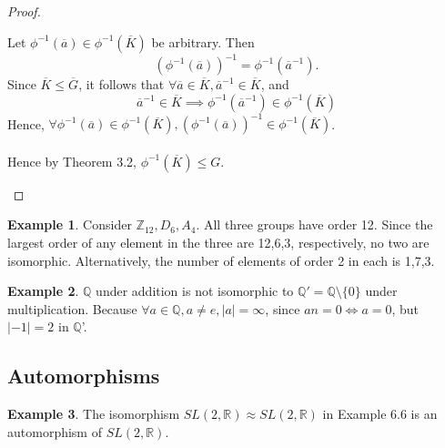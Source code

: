 \documentclass{article}
\theoremstyle{definition}
\newtheorem{definition}{Definition}[section]
\newtheorem{example}{Example}[section]
\begin{document}
\begin{proof}
\begin{enumerate}[label=(\roman*)]
         Let $\phi^{-1}(\overline{a}) \in \phi^{-1}(\overline{K})$ be arbitrary. Then
         \begin{equation*}
             (\phi^{-1}(\overline{a}))^{-1} = \phi^{-1}(\overline{a}^{-1}).
         \end{equation*}
         Since $\overline{K} \leq \overline{G}$, it follows that $\forall \overline{a} \in \overline{K}, \overline{a}^{-1} \in \overline{K}$, and
         \begin{equation*}
             \overline{a}^{-1} \in \overline{K} \implies \phi^{-1}(\overline{a}^{-1}) \in \phi^{-1}(\overline{K})
         \end{equation*}
         Hence, $\forall \phi^{-1}(\overline{a}) \in \phi^{-1}(\overline{K}), (\phi^{-1}(\overline{a}))^{-1} \in \phi^{-1}(\overline{K})$.
         \\ \\
         Hence by Theorem 3.2, $\phi^{-1}(\overline{K}) \leq G$.
     \end{enumerate}
 \end{proof}
 
 \begin{example}
     Consider $\mathbb{Z}_12, D_6, A_4$. All three groups have order 12. Since the largest order of any element in the three are 12,6,3, respectively, no two are isomorphic. Alternatively, the number of elements of order 2 in each is 1,7,3.
 \end{example}
 
 \begin{example}
     $\mathbb{Q}$ under addition is not isomorphic to $\mathbb{Q}' = \mathbb{Q} \setminus \{0\}$ under multiplication. Because $\forall a \in \mathbb{Q}, a \neq e, |a| = \infty$, since $an = 0 \iff a = 0$, but $|-1|=2$ in $\mathbb{Q}$'.
 \end{example}
 
 \subsection{Automorphisms}
 
 \begin{example}
     The isomorphism $SL(2,\mathbb{R}) \approx SL(2,\mathbb{R})$ in Example 6.6 is an automorphism of $SL(2,\mathbb{R})$.
 \end{example}
 
\end{document}

